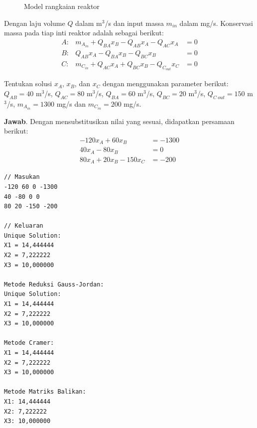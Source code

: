 {\begin{figure}
    \caption{Model rangkaian reaktor}
\end{figure}
\par}

Dengan laju volume $Q$ dalam m$^3$/s dan input massa $m_{in}$ dalam mg/s. Konservasi massa pada tiap inti reaktor adalah sebagai berikut:\\

$$\begin{array}{rrl}
    A:& m_{A_{in}} + Q_{BA}x_B - Q_{AB}x_A - Q_{AC}x_A &= 0\\
    B:& Q_{AB}x_A - Q_{BA}x_B - Q_{BC}x_B &= 0\\
    C:& m_{C_{in}} + Q_{AC}x_A + Q_{BC}x_B - Q_{C_{out}} x_C &= 0
\end{array}$$

Tentukan solusi $x_A$, $x_B$, dan $x_C$ dengan menggunakan parameter berikut: $Q_{AB} = 40$ m$^3$/s, $Q_{AC} = 80$ m$^3$/s, $Q_{BA} = 60$ m$^3$/s, $Q_{BC} = 20$ m$^3$/s, $Q_{C \ out} = 150$ m$^3$/s, $m_{A_{in}} = 1300$ mg/s dan $m_{C_{in}} = 200$ mg/s.

\textbf{Jawab}. Dengan mensubstitusikan nilai yang sesuai, didapatkan persamaan berikut:
\begin{align*}
    -120x_A + 60x_B &= -1300\\
    40 x_A - 80x_B &= 0 \\
    80x_A + 20x_B - 150 x_C &= -200
\end{align*}

\begin{lstlisting}[caption = spl-4.txt]
// Masukan
-120 60 0 -1300
40 -80 0 0
80 20 -150 -200

// Keluaran
Unique Solution:
X1 = 14,444444
X2 = 7,222222
X3 = 10,000000

Metode Reduksi Gauss-Jordan:
Unique Solution:
X1 = 14,444444
X2 = 7,222222
X3 = 10,000000

Metode Cramer:
X1 = 14,444444
X2 = 7,222222
X3 = 10,000000

Metode Matriks Balikan:
X1: 14,444444
X2: 7,222222
X3: 10,000000\end{lstlisting}

